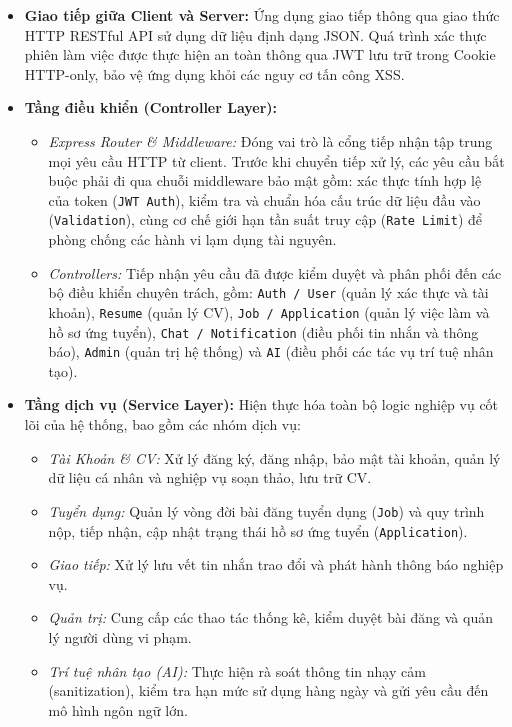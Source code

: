 \begin{enumerate}
\begin{itemize}
        \item \textbf{Giao tiếp giữa Client và Server:} Ứng dụng giao tiếp thông qua giao thức HTTP RESTful API sử dụng dữ liệu định dạng JSON. Quá trình xác thực phiên làm việc được thực hiện an toàn thông qua JWT lưu trữ trong Cookie HTTP-only, bảo vệ ứng dụng khỏi các nguy cơ tấn công XSS.

        \item \textbf{Tầng điều khiển (Controller Layer):}
        \begin{itemize}
            \item \textit{Express Router \& Middleware:} Đóng vai trò là cổng tiếp nhận tập trung mọi yêu cầu HTTP từ client. Trước khi chuyển tiếp xử lý, các yêu cầu bắt buộc phải đi qua chuỗi middleware bảo mật gồm: xác thực tính hợp lệ của token (\texttt{JWT Auth}), kiểm tra và chuẩn hóa cấu trúc dữ liệu đầu vào (\texttt{Validation}), cùng cơ chế giới hạn tần suất truy cập (\texttt{Rate Limit}) để phòng chống các hành vi lạm dụng tài nguyên.
            \item \textit{Controllers:} Tiếp nhận yêu cầu đã được kiểm duyệt và phân phối đến các bộ điều khiển chuyên trách, gồm: \texttt{Auth / User} (quản lý xác thực và tài khoản), \texttt{Resume} (quản lý CV), \texttt{Job / Application} (quản lý việc làm và hồ sơ ứng tuyển), \texttt{Chat / Notification} (điều phối tin nhắn và thông báo), \texttt{Admin} (quản trị hệ thống) và \texttt{AI} (điều phối các tác vụ trí tuệ nhân tạo).
        \end{itemize}

        \item \textbf{Tầng dịch vụ (Service Layer):} Hiện thực hóa toàn bộ logic nghiệp vụ cốt lõi của hệ thống, bao gồm các nhóm dịch vụ:
        \begin{itemize}
            \item \textit{Tài Khoản \& CV:} Xử lý đăng ký, đăng nhập, bảo mật tài khoản, quản lý dữ liệu cá nhân và nghiệp vụ soạn thảo, lưu trữ CV.
            \item \textit{Tuyển dụng:} Quản lý vòng đời bài đăng tuyển dụng (\texttt{Job}) và quy trình nộp, tiếp nhận, cập nhật trạng thái hồ sơ ứng tuyển (\texttt{Application}).
            \item \textit{Giao tiếp:} Xử lý lưu vết tin nhắn trao đổi và phát hành thông báo nghiệp vụ.
            \item \textit{Quản trị:} Cung cấp các thao tác thống kê, kiểm duyệt bài đăng và quản lý người dùng vi phạm.
            \item \textit{Trí tuệ nhân tạo (AI):} Thực hiện rà soát thông tin nhạy cảm (sanitization), kiểm tra hạn mức sử dụng hàng ngày và gửi yêu cầu đến mô hình ngôn ngữ lớn.
        \end{itemize}


\end{itemize}
\end{enumerate}
